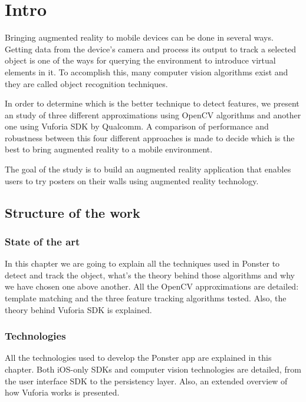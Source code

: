 \chapter{Intro}

Bringing augmented reality to mobile devices can be done in several ways. Getting
data from the device's camera and process its output to track a selected object is
one of the ways for querying the environment to introduce virtual elements in it. To
accomplish this, many computer vision algorithms exist and they are called object
recognition techniques.  

In order to determine which is the better technique to detect features, we present
an study of three different approximations using OpenCV algorithms and another one
using Vuforia SDK by Qualcomm\textregistered. A comparison of performance and
robustness between this four different approaches is made to decide which is the
best to bring augmented reality to a mobile environment.

The goal of the study is to build an augmented reality application that enables 
users to try posters on their walls using augmented reality technology.

\section*{Structure of the work}
\subsection*{State of the art}
In this chapter we are going to explain all the techniques used in Ponster to
detect and track the object, what's the theory behind those algorithms and why
we have chosen one above another. All the OpenCV approximations are detailed:
template matching and the three feature tracking algorithms tested. Also, the
theory behind Vuforia SDK is explained.

\subsection*{Technologies}
All the technologies used to develop the Ponster app are explained in this
chapter. Both iOS-only SDKs and computer vision technologies are detailed,
from the user interface SDK to the persistency layer. Also, an extended
overview of how Vuforia works is presented.


